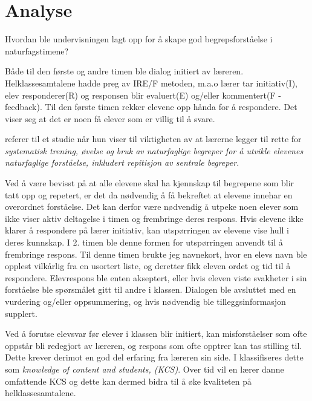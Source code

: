 \documentclass[main.tex]{subfiles}
\begin{document}
\section*{Analyse}
\label{sec:2}

Hvordan ble undervisningen lagt opp for å skape god begrepsforståelse i naturfagstimene?

Både til den første og andre timen ble dialog initiert av læreren. Helklassesamtalene hadde preg av
IRE/F metoden, m.a.o lærer tar initiativ(I), elev responderer(R) og responsen blir evaluert(E) 
og/eller kommentert(F - feedback). Til den første timen rekker elevene opp hånda for å 
respondere. Det viser seg at det er noen få elever som er villig til å svare. 


 referer til et studie når hun viser til viktigheten av at lærerne 
legger til rette for \emph{systematisk trening, øvelse og bruk av naturfaglige begreper for å utvikle 
elevenes naturfaglige forståelse, inkludert repitisjon av sentrale begreper.}

Ved å være bevisst på at alle elevene skal ha kjennskap til 
begrepene som blir tatt opp og repetert, er det da nødvendig å få bekreftet at elevene innehar en 
overordnet forståelse. Det kan derfor være nødvendig å utpeke noen elever som ikke viser aktiv 
deltagelse i timen og frembringe deres respons. Hvis elevene ikke klarer å respondere på lærer 
initiativ, kan utspørringen av elevene vise hull i deres kunnskap. I 2. timen ble denne formen for
utspørringen anvendt til å frembringe respons. Til denne timen brukte jeg navnekort, hvor en elevs navn 
ble opplest vilkårlig fra en usortert liste, og deretter fikk eleven ordet og tid til å respondere. 
Elevrespons ble enten akseptert, eller hvis eleven viste svakheter i sin forståelse ble spørsmålet 
gitt til andre i klassen. Dialogen ble avsluttet med en vurdering og/eller oppsummering, og hvis 
nødvendig ble tilleggsinformasjon supplert. 

Ved å forutse elevsvar før elever i klassen blir initiert, kan misforståelser som ofte oppstår bli redegjort
av læreren, og respons som ofte opptrer kan tas stilling til. Dette krever derimot en god del erfaring fra 
læreren sin side. I  klassifiseres dette som \emph{knowledge of content and students, (KCS)}.
Over tid vil en lærer danne omfattende KCS og dette kan dermed bidra til å øke kvaliteten på helklassesamtalene.
\end{document}
